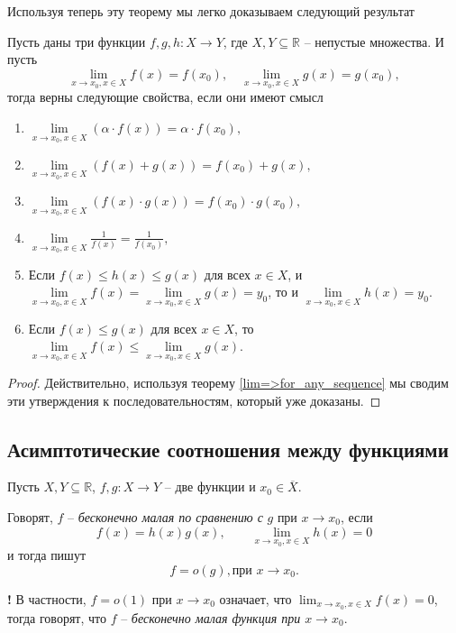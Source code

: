 Используя теперь эту теорему мы легко доказываем следующий результат


\begin{theorem}\label{lim(f+g)}
Пусть даны три функции $f,g,h: X \to Y$, где $X,Y \subseteq \mathbb{R}$ -- непустые множества. И пусть
\[
 \lim_{x\to x_0, x \in X} f(x) = f(x_0),\quad  \lim_{x\to x_0, x \in X} g(x) = g(x_0),
\]
тогда верны следующие свойства, если они имеют смысл
\begin{enumerate}
     \item $\lim\limits_{x \to x_0, x \in X}(\alpha \cdot f(x)) = \alpha \cdot f(x_0),$
    \item $\lim\limits_{x\to x_0, x \in X} (f(x)+  g(x)) =  f(x_0) +  g(x),$
    \item $\lim\limits_{x\to x_0, x \in X} (f(x)\cdot g(x)) = f(x_0)\cdot g(x_0),$
    \item $\lim\limits_{x\to x_0, x \in X} \frac{1}{f(x)} = \frac{1}{f(x_0)},$
    \item Если $f(x) \le h(x) \le g(x)$ для всех $x\in X$, и $ \lim\limits_{x\to x_0, x \in X} f(x) =  \lim\limits_{x\to x_0, x \in X} g(x) = y_0$, то и $ \lim\limits_{x\to x_0, x \in X} h(x) = y_0$.
    \item Если $f(x) \le g(x)$ для всех $x \in X$, то $ \lim\limits_{x\to x_0, x \in X} f(x) \le  \lim\limits_{x\to x_0, x \in X} g(x).$
\end{enumerate}
\end{theorem}
\begin{proof}
    Действительно, используя теорему \ref{lim=>for_any_sequence} мы сводим эти утверждения к последовательностям, который уже доказаны.
\end{proof}


\subsection{Асимптотические соотношения между функциями}

Пусть $X,Y \subseteq \mathbb{R}$, $f,g:X \to Y$ -- две функции и $x_0  \in \overline{X}$.

\begin{definition}
Говорят, $f$ -- \textit{бесконечно малая по сравнению с } $g$ при $x \to x_0$, если
\[
 f(x) = h(x)g(x),\qquad \lim_{x\to x_0, x \in X}h(x) = 0
\]
и тогда пишут 
\[
f = o(g), \mbox{при $x \to x_0$.}
\]
\end{definition}

\begin{mydangerr}{\bf!}
В частности, $f = o(1)$ при $x \to x_0$ означает, что $\lim_{x\to x_0, x \in X}f(x) = 0$, тогда говорят, что $f$ -- \textit{бесконечно малая функция при $x \to x_0$}.    
\end{mydangerr}

